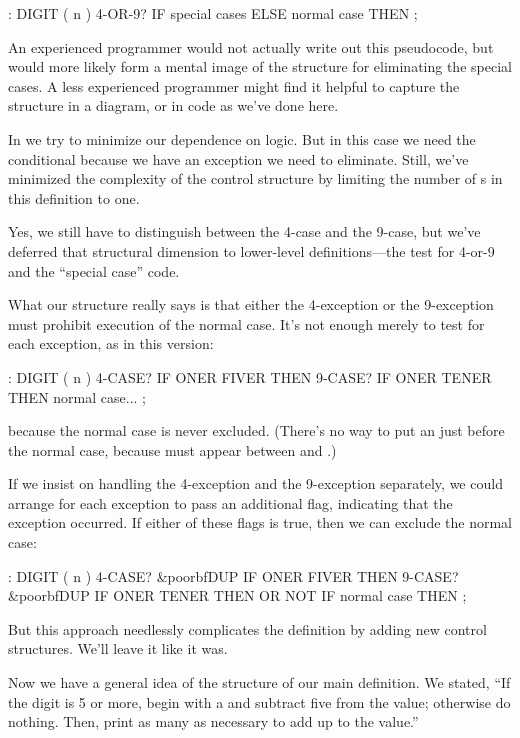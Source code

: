\begin{Code}
: DIGIT  ( n )  4-OR-9? IF  special cases
   ELSE  normal case  THEN ;
\end{Code}
An experienced \Forth{} programmer would not actually write out this
pseudocode, but would more likely form a mental image of the structure
for eliminating the special cases. A less experienced programmer might
find it helpful to capture the structure in a diagram, or in code as we've
done here.

In \Forth{} we try to minimize our dependence on logic. But in this
case we need the conditional  because we have an exception we need to
eliminate. Still, we've minimized the complexity of the control structure
by limiting the number of s in this definition to one.

Yes, we still have to distinguish between the 4-case and the 9-case,
but we've deferred that structural dimension to lower-level
definitions---the test for 4-or-9 and the ``special case'' code.

What our structure really says is that either the 4-exception or the
9-exception must prohibit execution of the normal case. It's not enough
merely to test for each exception, as in this version:

\begin{Code}
: DIGIT  ( n )  4-CASE? IF  ONER FIVER  THEN
                9-CASE? IF  ONER TENER  THEN
                normal case... ;
\end{Code}
because the normal case is never excluded. (There's no way to put an
 just before the normal case, because  must appear between
 and .)

If we insist on handling the 4-exception and the 9-exception
separately, we could arrange for each exception to pass an additional
flag, indicating that the exception occurred. If either of these flags is
true, then we can exclude the normal case:

\begin{Code}[commandchars=\&\{\}]
: DIGIT  ( n )  4-CASE? &poorbf{DUP} IF  ONER FIVER  THEN
                9-CASE? &poorbf{DUP} IF  ONER TENER  THEN
                OR  NOT IF normal case THEN ;
\end{Code}
But this approach needlessly complicates the definition by adding new
control structures. We'll leave it like it was.

Now we have a general idea of the structure of our main definition.
We stated, ``If the digit is 5 or more, begin with a  and subtract
five from the value; otherwise do nothing. Then, print as many
 as necessary to add up to the value.''

